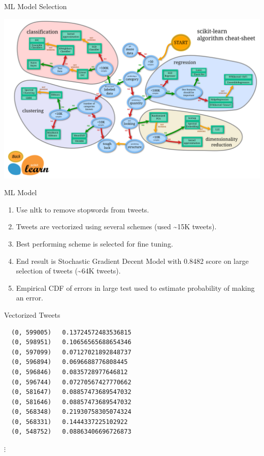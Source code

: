 \documentclass[12pt]{article}
\theoremstyle{example}
\theoremstyle{defn}
\begin{document}
\clearpage

ML Model Selection

\hspace*{\fill}
\includegraphics[scale=0.06]{ml_map.png}
\hspace*{\fill}

\clearpage

ML Model

\vspace*{-10pt}
\begin{enumerate}
\item Use nltk to remove stopwords from tweets.
\item Tweets are vectorized using several schemes (used {\textasciitilde}15K tweets).
\item Best performing scheme is selected for fine tuning.
\item End result is Stochastic Gradient Decent Model with 0.8482 score on large selection of tweets ({\textasciitilde}64K tweets).
\item Empirical CDF of errors in large test used to estimate probability of making an error.
\end{enumerate}

\clearpage

Vectorized Tweets

\vspace*{-20pt}
\begin{footnotesize}
\begin{verbatim}
  (0, 599005)	0.13724572483536815
  (0, 598951)	0.10656565688654346
  (0, 597099)	0.07127021892848737
  (0, 596894)	0.0696688776808445
  (0, 596846)	0.0835728977646812
  (0, 596744)	0.07270567427770662
  (0, 581647)	0.08857473689547032
  (0, 581646)	0.08857473689547032
  (0, 568348)	0.21930758305074324
  (0, 568331)	0.1444337225102922
  (0, 548752)	0.08863406696726873
\end{verbatim}

\vspace*{-20pt}
\hspace*{80pt}$\vdots$
\end{footnotesize}
\clearpage
\end{document}

